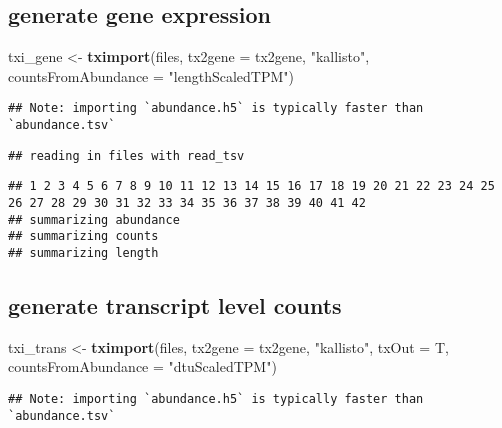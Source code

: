 \documentclass[]{article}
\newenvironment{Shaded}{\begin{snugshade}}{\end{snugshade}}
\newcommand{\DataTypeTok}[1]{\textcolor[rgb]{0.13,0.29,0.53}{#1}}
\newcommand{\KeywordTok}[1]{\textcolor[rgb]{0.13,0.29,0.53}{\textbf{#1}}}
\newcommand{\NormalTok}[1]{#1}
\newcommand{\StringTok}[1]{\textcolor[rgb]{0.31,0.60,0.02}{#1}}
\begin{document}
\hypertarget{generate-gene-expression}{%
\subsection{generate gene expression}\label{generate-gene-expression}}

\begin{Shaded}
\begin{Highlighting}[]
\NormalTok{txi_gene <-}\StringTok{ }\KeywordTok{tximport}\NormalTok{(files, }\DataTypeTok{tx2gene =}\NormalTok{ tx2gene, }\StringTok{"kallisto"}\NormalTok{, }\DataTypeTok{countsFromAbundance =} \StringTok{"lengthScaledTPM"}\NormalTok{)}
\end{Highlighting}
\end{Shaded}

\begin{verbatim}
## Note: importing `abundance.h5` is typically faster than `abundance.tsv`
\end{verbatim}

\begin{verbatim}
## reading in files with read_tsv
\end{verbatim}

\begin{verbatim}
## 1 2 3 4 5 6 7 8 9 10 11 12 13 14 15 16 17 18 19 20 21 22 23 24 25 26 27 28 29 30 31 32 33 34 35 36 37 38 39 40 41 42 
## summarizing abundance
## summarizing counts
## summarizing length
\end{verbatim}

\hypertarget{generate-transcript-level-counts}{%
\subsection{generate transcript level
counts}\label{generate-transcript-level-counts}}

\begin{Shaded}
\begin{Highlighting}[]
\NormalTok{txi_trans <-}\StringTok{ }\KeywordTok{tximport}\NormalTok{(files, }\DataTypeTok{tx2gene =}\NormalTok{ tx2gene, }\StringTok{"kallisto"}\NormalTok{, }\DataTypeTok{txOut =}\NormalTok{ T, }\DataTypeTok{countsFromAbundance =} \StringTok{"dtuScaledTPM"}\NormalTok{)}
\end{Highlighting}
\end{Shaded}

\begin{verbatim}
## Note: importing `abundance.h5` is typically faster than `abundance.tsv`
\end{verbatim}
\end{document}
